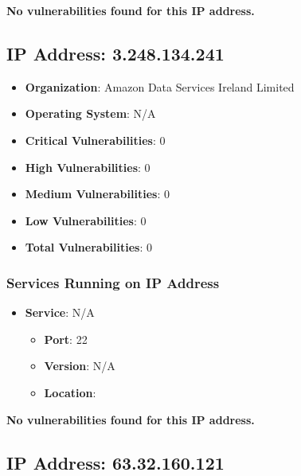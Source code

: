 \documentclass{article}
\begin{document}
\textbf{No vulnerabilities found for this IP address.}




\clearpage



\subsection*{IP Address: 3.248.134.241}

\begin{itemize}
    \item \textbf{Organization}: Amazon Data Services Ireland Limited
    \item \textbf{Operating System}:  N/A 
    \item \textbf{Critical Vulnerabilities}: 0
    \item \textbf{High Vulnerabilities}: 0
    \item \textbf{Medium Vulnerabilities}: 0
    \item \textbf{Low Vulnerabilities}: 0
    \item \textbf{Total Vulnerabilities}: 0
\end{itemize}

\subsubsection*{Services Running on IP Address}

\begin{itemize}
    
        \item \textbf{Service}: N/A
        \begin{itemize}
            \item \textbf{Port}: 22
            \item \textbf{Version}:  N/A 
            \item \textbf{Location}: \href{  }{  }
        \end{itemize}
    
\end{itemize}


\textbf{No vulnerabilities found for this IP address.}




\clearpage



\subsection*{IP Address: 63.32.160.121}
\end{document}
